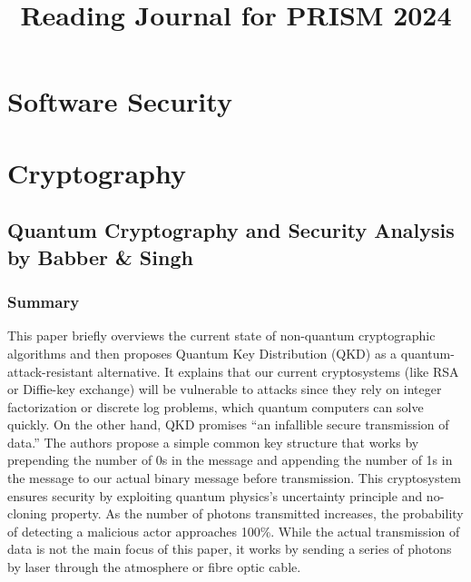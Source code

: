 \documentclass{article}
\begin{document}

\title{Reading Journal for PRISM 2024}
\author{}
\date{}
\maketitle

\section{Software Security}

\section{Cryptography}
\subsection*{Quantum Cryptography and Security Analysis by Babber \& Singh}

\subsubsection*{Summary}
This paper briefly overviews the current state of non-quantum cryptographic algorithms and then proposes Quantum Key Distribution (QKD) as a quantum-attack-resistant alternative. 
It explains that our current cryptosystems (like RSA or Diffie-key exchange) will be vulnerable to attacks since they rely on integer factorization or discrete log problems, which quantum computers can solve quickly.
On the other hand, QKD promises “an infallible secure transmission of data.” 
The authors propose a simple common key structure that works by prepending the number of 0s in the message and appending the number of 1s in the message to our actual binary message before transmission. 
This cryptosystem ensures security by exploiting quantum physics's uncertainty principle and no-cloning property. 
As the number of photons transmitted increases, the probability of detecting a malicious actor approaches 100\%.
While the actual transmission of data is not the main focus of this paper, it works by sending a series of photons by laser through the atmosphere or fibre optic cable. 
\end{document}
